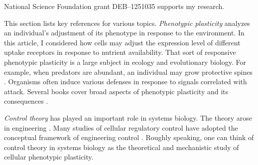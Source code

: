 \documentclass[\mydocfontsize]{article}
\begin{document}
\begin{multicols}{2}
\noindent National Science Foundation grant DEB--1251035 supports my research.  


\begingroup
\renewcommand{\addcontentsline}[3]{}%
\renewcommand{\section}[2]{}%

\mybiblio	%
\endgroup

\section*{Appendix}

This section lists key references for various topics. \textit{Phenotypic plasticity} analyzes an individual's adjustment of its phenotype in response to the environment. In this article, I considered how cells may adjust the expression level of different uptake receptors in response to nutrient availability. That sort of responsive phenotypic plasticity is a large subject in ecology and evolutionary biology. For example, when predators are abundant, an individual may grow protective spines \autocite{99the-ecology}. Organisms often induce various defenses in response to signals correlated with attack. Several books cover broad aspects of phenotypic plasticity and its consequences \autocite{pigliucci01phenotypic,west-eberhard03developmental,dewitt04phenotypic}.

\textit{Control theory} has played an important role in systems biology. The theory arose in engineering \autocite{davison07what,doyle09feedback,ogata09modern,dorf16modern}. Many studies of cellular regulatory control have adopted the conceptual framework of engineering control \autocite{csete02reverse,alon07an-introduction,09control,cosentino11feedback,somvanshi15implementation}. Roughly speaking, one can think of control theory in systems biology as the theoretical and mechanistic study of cellular phenotypic plasticity. 


\end{multicols}
\end{document}
